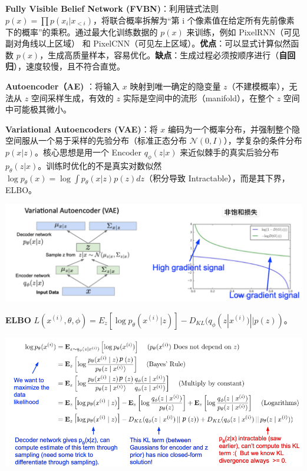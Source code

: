 \documentclass[
  8pt]{extarticle}
\begin{document}
\begin{multicols*}{4}
\textbf{Fully Visible Belief Network (FVBN)}：利用链式法则
\(p(x)=\prod p(x_i | x_{<i})\)，将联合概率拆解为``第 i
个像素值在给定所有先前像素下的概率''的乘积。通过最大化训练数据的
\(p(x)\) 来训练，例如 PixelRNN（可见副对角线以上区域） 和
PixelCNN（可见左上区域）。\textbf{优点}：可以显式计算似然函数
\(p(x)\)，生成高质量样本，容易优化。\textbf{缺点}：生成过程必须按顺序进行（\textbf{自回归}），速度较慢，且不符合直觉。

\textbf{Autoencoder（AE) }：将输入 \(x\) 映射到唯一确定的隐变量
\(z\)（不建模概率），无法从 \(z\) 空间采样生成，有效的 \(z\)
实际是空间中的流形（manifold），在整个 \(z\) 空间中可能极其微小。

\textbf{Variational Autoencoders (VAE)}：将 \(x\)
编码为一个概率分布，并强制整个隐空间服从一个易于采样的先验分布（标准正态分布
\(\mathcal{N}(0, I)\)），学复杂的条件分布 \(p(x|z)\)。核心思想是用一个
Encoder \(q_\phi(z|x)\) 来近似棘手的真实后验分布
\(p_\theta(z|x)\)。训练时优化的不是真实对数似然
\(\log p_\theta(x) = \log \int p_\theta(x|z)p(z)dz\)（积分导致
Intractable），而是其下界，ELBO。

\includegraphics{./Cheatsheet-04-Generative-Model.assets/image-20250617192929555.png}

\textbf{ELBO}
\(L(x^{(i)}, \theta, \phi) = E_z[\log p_\theta(x^{(i)}|z)] - D_{KL}(q_\phi(z|x^{(i)}) || p(z))\)。

\includegraphics{./Cheatsheet-04-Generative-Model.assets/image-20250617192057785.png}


\end{multicols*}
\end{document}
